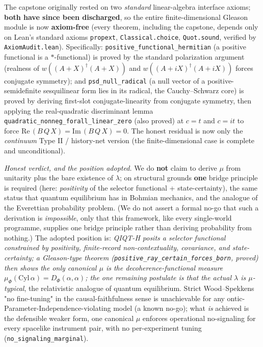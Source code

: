 \documentclass[11pt,a4paper]{article}
\begin{document}
The capstone originally rested on two \emph{standard} linear-algebra interface axioms; \textbf{both have since been discharged}, so the entire finite-dimensional Gleason module is now \textbf{axiom-free} (every theorem, including the capstone, depends only on Lean's standard axioms \texttt{propext}, \texttt{Classical.choice}, \texttt{Quot.sound}, verified by \texttt{AxiomAudit.lean}). Specifically: \texttt{positive\_functional\_hermitian} (a positive functional is a $*$-functional) is proved by the standard polarization argument (realness of $w((A+X)^\dagger(A+X))$ and $w((A+iX)^\dagger(A+iX))$ forces conjugate symmetry); and \texttt{psd\_null\_radical} (a null vector of a positive-semidefinite sesquilinear form lies in its radical, the Cauchy–Schwarz core) is proved by deriving first-slot conjugate-linearity from conjugate symmetry, then applying the real-quadratic discriminant lemma \texttt{quadratic\_nonneg\_forall\_linear\_zero} (also proved) at $c = t$ and $c = it$ to force $\mathrm{Re}\,(B\,Q\,X) = \mathrm{Im}\,(B\,Q\,X) = 0$. The honest residual is now only the \emph{continuum} Type II / history-net version (the finite-dimensional case is complete and unconditional).

\emph{Honest verdict, and the position adopted.} We do \textbf{not} claim to derive $\mu$ from unitarity plus the bare existence of $\lambda$; on structural grounds \textbf{one} bridge principle is required (here: \emph{positivity} of the selector functional + state-certainty), the same status that quantum equilibrium has in Bohmian mechanics, and the analogue of the Everettian probability problem. (We do not assert a formal no-go that such a derivation is \emph{impossible}, only that this framework, like every single-world programme, supplies one bridge principle rather than deriving probability from nothing.) The adopted position is: \emph{QIQT-H posits a selector functional constrained by positivity, finite-record non-contextuality, covariance, and state-certainty; a Gleason-type theorem (\texttt{positive\_ray\_certain\_forces\_born}, proved) then shows the only canonical $\mu$ is the decoherence-functional measure $\mu_\Phi(\mathrm{Cyl}\,\alpha) = D_\Phi(\alpha,\alpha)$; the one remaining postulate is that the actual $\lambda$ is $\mu$-typical}, the relativistic analogue of quantum equilibrium. Strict Wood–Spekkens "no fine-tuning" in the causal-faithfulness sense is unachievable for any ontic-Parameter-Independence-violating model (a known no-go); what \emph{is} achieved is the defensible weaker form, one canonical $\mu$ enforces operational no-signaling for every spacelike instrument pair, with no per-experiment tuning (\texttt{no\_signaling\_marginal}).
\end{document}
